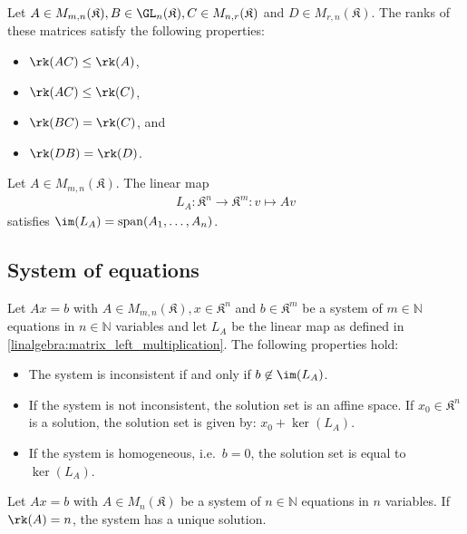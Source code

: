     \begin{property}\label{linalgebra:rank_properties}
        Let $A\in M_{m,n}(\mathfrak{K}),B\in\GL_n(\mathfrak{K}),C\in M_{n,r}(\mathfrak{K})$ and $D\in M_{r,n}(\mathfrak{K})$. The ranks of these matrices satisfy the following properties:
        \begin{itemize}
            \item $\rk(AC)\leq\rk(A)$,
            \item $\rk(AC)\leq\rk(C)$,
            \item $\rk(BC)=\rk(C)$, and
            \item $\rk(DB)=\rk(D)$.
        \end{itemize}
    \end{property}
    \begin{property}\label{linalgebra:matrix_left_multiplication}
        Let $A\in M_{m,n}(\mathfrak{K})$. The linear map
        \begin{gather}
            L_A:\mathfrak{K}^n\rightarrow \mathfrak{K}^m:v\mapsto Av
        \end{gather}
        satisfies $\im(L_A)=\mathrm{span}(A_1,\ldots,A_n)$.
    \end{property}

\subsection{System of equations}\label{section:system_of_equations}

    \begin{property}\label{linalgebra:matrix_and_equations}
        Let $Ax=b$ with $A\in M_{m,n}(\mathfrak{K}),x\in\mathfrak{K}^n$ and $b\in\mathfrak{K}^m$ be a system of $m\in\mathbb{N}$ equations in $n\in\mathbb{N}$ variables and let $L_A$ be the linear map as defined in \cref{linalgebra:matrix_left_multiplication}. The following properties hold:
        \begin{itemize}
            \item The system is inconsistent if and only if $b\not\in\im(L_A)$.
            \item If the system is not inconsistent, the solution set is an affine space. If $x_0\in\mathfrak{K}^n$ is a solution, the solution set is given by: $x_0+\ker(L_A)$.
            \item If the system is homogeneous, i.e.~$b=0$, the solution set is equal to $\ker(L_A)$.
        \end{itemize}
    \end{property}
    \begin{property}[Uniqueness]\label{linalgebra:rank_unique_solution}
        Let $Ax=b$ with $A\in M_n(\mathfrak{K})$ be a system of $n\in\mathbb{N}$ equations in $n$ variables. If $\rk(A)=n$, the system has a unique solution.
    \end{property}

